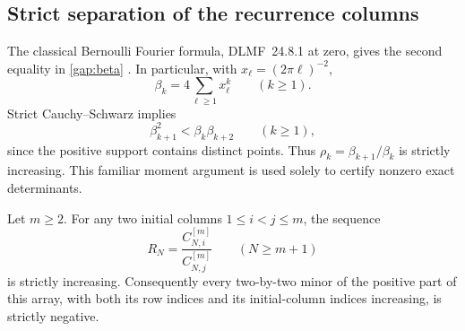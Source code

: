 \subsection{Strict separation of the recurrence columns}

The classical Bernoulli Fourier formula, DLMF~24.8.1 at zero,
gives the second equality in \eqref{gap:beta} \cite{DLMF}. In particular, with
$x_\ell=(2\pi\ell)^{-2}$,
\[
 \beta_k=4\sum_{\ell\ge1}x_\ell^k\qquad(k\ge1).
\]
Strict Cauchy--Schwarz implies
\begin{equation}\label{gap:strict-log-convexity}
 \beta_{k+1}^2<\beta_k\beta_{k+2}\qquad(k\ge1),
\end{equation}
since the positive support contains distinct points. Thus
$\rho_k=\beta_{k+1}/\beta_k$ is strictly increasing. This familiar
moment argument is used solely to certify nonzero exact determinants.

\begin{lemma}\label{gap:ratio-lemma}
Let $m\ge2$. For any two initial columns $1\le i<j\le m$, the sequence
\begin{equation}\label{gap:ratio}
 R_N=\frac{C_{N,i}^{[m]}}{C_{N,j}^{[m]}}
       \qquad(N\ge m+1)
\end{equation}
is strictly increasing. Consequently every two-by-two minor of the
positive part of this array, with both its row indices and its
initial-column indices increasing, is strictly negative.
\end{lemma}

